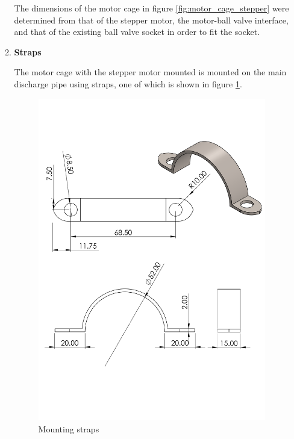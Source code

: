 \begin{enumerate}
\begin{enumerate}
    The dimensions of the motor cage in figure \ref{fig:motor_cage_stepper} were determined from that of the stepper motor, the motor-ball valve interface, and that of the existing ball valve socket in order to fit the socket.
    
    \item \textbf{Straps}
    \par
    The motor cage with the stepper motor mounted is mounted on the main discharge pipe using straps, one of which is shown in figure \ref{fig:mounting_straps_stepper}.
    
    \begin{figure}[H]
        \centering
        \includegraphics[height=.65\textheight]{Figures/strap.PNG}
        \caption{Mounting straps}
        \label{fig:mounting_straps_stepper}
    \end{figure}
    

\end{enumerate}
\end{enumerate}
